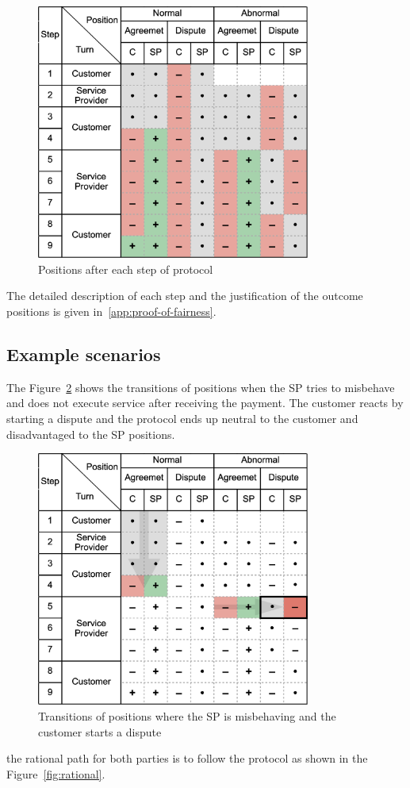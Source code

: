 \begin{figure}[h!]
\includegraphics[width=9cm]{model.png}
\centering
\caption{Positions after each step of protocol}
\label{fig:positions}
\end{figure}

The detailed description of each step and the justification
of the outcome positions is given in~\ref{app:proof-of-fairness}.

\subsection{Example scenarios}\label{example-scenarios}

The Figure~\ref{fig:misbehaviour} shows the transitions of positions when the SP tries to misbehave and does not execute service after receiving the payment. The customer reacts by starting a dispute and the protocol ends up neutral to the customer and disadvantaged to the SP positions.

\begin{figure}[h!]
\includegraphics[width=9cm]{misbehaviour.png}
\centering
\caption{Transitions of positions where the SP is misbehaving and the customer starts a dispute}
\label{fig:misbehaviour}
\end{figure}
the rational path for both parties is to follow the protocol as shown in the Figure~\ref{fig:rational}.

